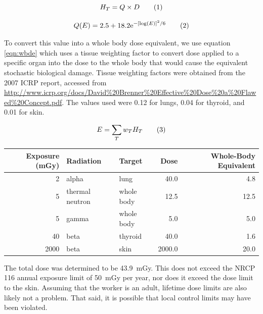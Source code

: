 \documentclass{hw}
\begin{document}
\begin{equation*}
    \label{eqn:dose}
    H_T = Q \times D \numberthis
\end{equation*}

\begin{equation*}
    \label{eqn:q_neutron}
    Q(E) = 2.5 + 18.2 \mathrm{e}^{-\left[ \log(E) \right]^2 / 6} \numberthis
\end{equation*}

To convert this value into a whole body dose equivalent, we use equation 
\ref{eqn:wbde} which uses a tissue weighting factor to convert dose applied to 
a specific organ into the dose to the whole body that would cause the 
equivalent stochastic biological damage. Tissue weighting factors were obtained 
from the 2007 ICRP report, accessed from 
\url{http://www.icrp.org/docs/David%20Brenner%20Effective%20Dose%20a%20Flawed%20Concept.pdf}. 
The values used were 0.12 for lungs, 0.04 for thyroid, and 0.01 for skin.

\begin{equation*}
    \label{eqn:wbde}
    E = \sum_T w_T H_T \numberthis
\end{equation*}

\begin{tabular}{rllrr}
\toprule
Exposure (mGy) &        Radiation &      Target &    Dose &  Whole-Body Equivalent \\
\midrule
             2 &            alpha &        lung &    40.0 &                    4.8 \\
             5 &  thermal neutron &  whole body &    12.5 &                   12.5 \\
             5 &            gamma &  whole body &     5.0 &                    5.0 \\
            40 &             beta &     thyroid &    40.0 &                    1.6 \\
          2000 &             beta &        skin &  2000.0 &                   20.0 \\
\bottomrule
\end{tabular}

The total dose was determined to be \SI{43.9}{\milli\gray}. This does not 
exceed the NRCP 116 annual exposure limit of \SI{50}{\milli\gray} per year, nor 
does it exceed the dose limit to the skin. Assuming that the worker is an 
adult, lifetime dose limits are also likely not a problem. That said, it is 
possible that local control limits may have been violated.
\end{document}
